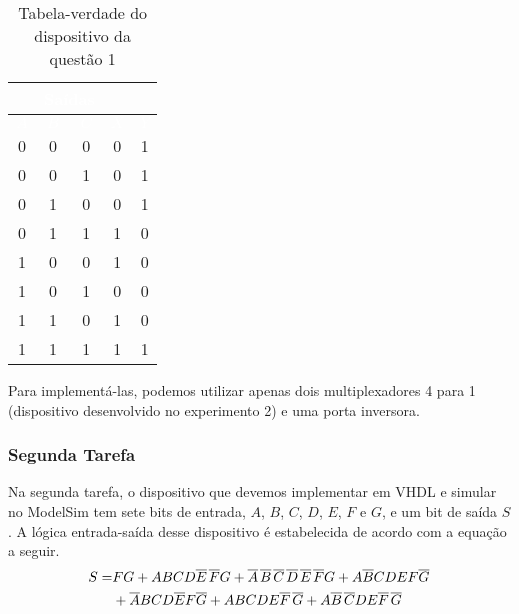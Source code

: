 \documentclass[a4paper,12pt]{article}
\begin{document}
\begin{table}[H]
    \centering
    \footnotesize
    \begin{tabular}{|c|c|c|c|c|}
        \hline
        \rowcolor{black}
        \multicolumn{3}{|c|}{\textbf{\textcolor{white}{Entradas}}} & \multicolumn{2}{|c|}{\textbf{\textcolor{white}{Saídas}}} \\ \hline
        \rowcolor{black}
        \textcolor{white}{$A$} & \textcolor{white}{$B$} & \textcolor{white}{$C$} & \textcolor{white}{$X$} & \textcolor{white}{$Y$} \\ \hline
        0 & 0 & 0 & 0 & 1 \\ \hline
        \rowcolor{cinza}
        0 & 0 & 1 & 0 & 1 \\ \hline
        0 & 1 & 0 & 0 & 1 \\ \hline
        \rowcolor{cinza}
        0 & 1 & 1 & 1 & 0 \\ \hline
        1 & 0 & 0 & 1 & 0 \\ \hline
        \rowcolor{cinza}
        1 & 0 & 1 & 0 & 0 \\ \hline
        1 & 1 & 0 & 1 & 0 \\ \hline
        \rowcolor{cinza}
        1 & 1 & 1 & 1 & 1 \\ \hline
    \end{tabular}
    \caption{Tabela-verdade do dispositivo da questão 1}
    \label{tab: q1_1}
    \vspace{-5pt}
\end{table}


Para implementá-las, podemos utilizar apenas dois multiplexadores 4 para 1 (dispositivo desenvolvido no experimento 2) e uma porta inversora.


\subsubsection{Segunda Tarefa}

Na segunda tarefa, o dispositivo que devemos implementar em VHDL e simular no ModelSim tem sete bits de entrada, $A$, $B$, $C$, $D$, $E$, $F$ e $G$, e um bit de saída $S$. A lógica entrada-saída desse dispositivo é estabelecida de acordo com a equação a seguir.
\begin{align*}
S = &FG + 
ABCD\overline{E} \hspace{0.05cm} \overline{F}G +
\overline{A} \hspace{0.05cm} \overline{B} \hspace{0.05cm} \overline{C} \hspace{0.05cm} \overline{D} \hspace{0.05cm} \overline{E} \hspace{0.05cm} \overline{F} G +
A \overline{B} C D E F \overline{G} \hspace{0.05cm} \\
&+ \overline{A} B C D \overline{E} F \overline{G} +
A B C D E \overline{F}  \hspace{0.05cm}  \overline{G} +
A \overline{B} \hspace{0.05cm} \overline{C} D E \overline{F} \hspace{0.05cm} \overline{G}
\end{align*}
\end{document}
